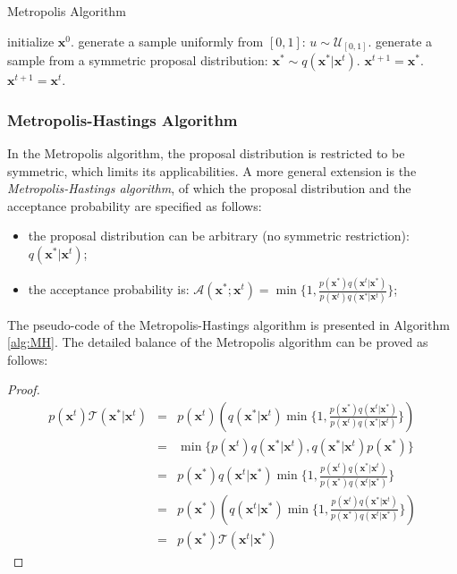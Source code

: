 \begin{algorithm}[h]
	\caption{Metropolis Algorithm}
	\label{alg:Metropolis}
\begin{algorithmic}[1]
\STATE initialize $\mathbf{x}^0$.
\STATE generate a sample uniformly from $[0,1]$: $u\sim \mathcal{U}_{[0,1]}$.
\STATE generate a sample from a symmetric proposal distribution: $\mathbf{x}^*\sim q(\mathbf{x}^*|\mathbf{x}^t)$.
\STATE $\mathbf{x}^{t+1}=\mathbf{x}^*$.
\ELSE 
\STATE $\mathbf{x}^{t+1}=\mathbf{x}^t$.
\ENDIF
\ENDFOR
\end{algorithmic}
\end{algorithm}

\subsubsection{Metropolis-Hastings Algorithm} 
In the Metropolis algorithm, the proposal distribution is restricted to be symmetric, which limits its applicabilities.   A more general extension is the \emph{Metropolis-Hastings algorithm}, 
of which the proposal distribution and the acceptance probability are specified as follows:
\begin{itemize}
	\item the proposal distribution can be arbitrary (no symmetric restriction): $q(\mathbf{x}^*|\mathbf{x}^t)$;
	\item the acceptance probability is: $\mathcal{A}(\mathbf{x}^*;\mathbf{x}^t) = \min\{1, \frac{p(\mathbf{x}^*)q(\mathbf{x}^t|\mathbf{x}^*)}{p(\mathbf{x}^t)q(\mathbf{x}^*|\mathbf{x}^t)}\}$; 
\end{itemize}
The pseudo-code of the Metropolis-Hastings algorithm is presented in Algorithm \ref{alg:MH}. 
The detailed balance of the Metropolis algorithm can be proved as follows:
\begin{proof}
	\begin{equation}
		\begin{array}{rcl}
			p(\mathbf{x}^t)\mathcal{T}(\mathbf{x}^*|\mathbf{x}^t)&=&p(\mathbf{x}^t)\left(q(\mathbf{x}^*|\mathbf{x}^t)\min\{1,\frac{p(\mathbf{x}^*)q(\mathbf{x}^t|\mathbf{x}^*)}{p(\mathbf{x}^t)q(\mathbf{x}^*|\mathbf{x}^t)}\}\right) \\
												       &=& \min\{p(\mathbf{x}^t)q(\mathbf{x}^*|\mathbf{x}^t),q(\mathbf{x}^*|\mathbf{x}^t)p(\mathbf{x}^*) \}  \\
			                                           &=& p(\mathbf{x}^*)q(\mathbf{x}^t|\mathbf{x}^*)\min\{1,\frac{p(\mathbf{x}^t)q(\mathbf{x}^*|\mathbf{x}^t)}{p(\mathbf{x}^*)q(\mathbf{x}^t|\mathbf{x}^*)}\} \\
										&=& p(\mathbf{x}^*)\left(q(\mathbf{x}^t|\mathbf{x}^*)\min\{1,\frac{p(\mathbf{x}^t)q(\mathbf{x}^*|\mathbf{x}^t)}{p(\mathbf{x}^*)q(\mathbf{x}^t|\mathbf{x}^*)}\}\right) \\
											  &=& p(\mathbf{x}^*)\mathcal{T}(\mathbf{x}^t|\mathbf{x}^*)
	   \end{array}
	\end{equation}
\end{proof}
